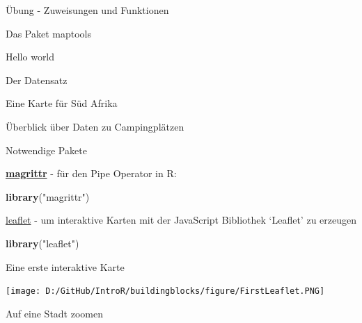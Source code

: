 \documentclass[ignorenonframetext,]{beamer}
\newenvironment{Shaded}{\begin{snugshade}}{\end{snugshade}}
\newcommand{\KeywordTok}[1]{\textcolor[rgb]{0.26,0.66,0.93}{\textbf{#1}}}
\newcommand{\NormalTok}[1]{\textcolor[rgb]{0.74,0.68,0.62}{#1}}
\newcommand{\OperatorTok}[1]{\textcolor[rgb]{0.74,0.68,0.62}{#1}}
\newcommand{\StringTok}[1]{\textcolor[rgb]{0.02,0.61,0.04}{#1}}
\begin{document}
\begin{frame}[fragile]{Übung - Zuweisungen und Funktionen}
\begin{frame}[fragile]{Das Paket maptools}
\begin{frame}[fragile]{Hello world}
\begin{frame}[fragile]{Der Datensatz}
\begin{frame}[fragile]{Eine Karte für Süd Afrika}
\begin{frame}{Überblick über Daten zu Campingplätzen}
\end{frame}

\begin{frame}[fragile]{Notwendige Pakete}
\protect\hypertarget{notwendige-pakete}{}

\begin{block}{\href{https://cran.r-project.org/web/packages/magrittr/index.html}{\textbf{magrittr}}
- für den Pipe Operator in R:}

\begin{Shaded}
\begin{Highlighting}[]
\KeywordTok{library}\NormalTok{(}\StringTok{"magrittr"}\NormalTok{)}
\end{Highlighting}
\end{Shaded}

\href{https://rstudio.github.io/leaflet/}{leaflet} - um interaktive
Karten mit der JavaScript Bibliothek `Leaflet' zu erzeugen

\begin{Shaded}
\begin{Highlighting}[]
\KeywordTok{library}\NormalTok{(}\StringTok{"leaflet"}\NormalTok{)}
\end{Highlighting}
\end{Shaded}

\end{block}

\end{frame}

\begin{frame}[fragile]{Eine erste interaktive Karte}
\protect\hypertarget{eine-erste-interaktive-karte}{}

\begin{Shaded}
\end{Shaded}

\texttt{[image: D:/GitHub/IntroR/buildingblocks/figure/FirstLeaflet.PNG]}

\end{frame}

\begin{frame}[fragile]{Auf eine Stadt zoomen}
\protect\hypertarget{auf-eine-stadt-zoomen}{}


\end{frame}
\end{frame}
\end{frame}
\end{frame}
\end{frame}
\end{frame}
\end{document}
